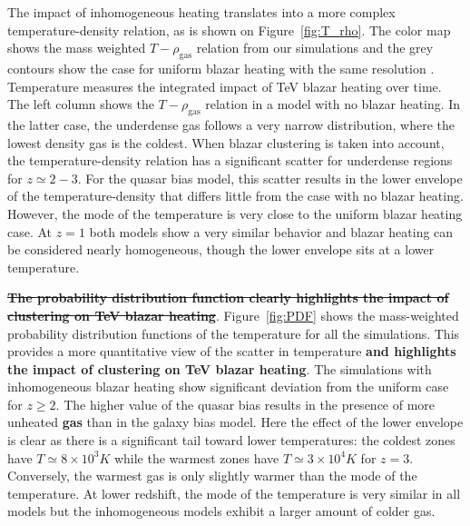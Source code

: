 \documentclass[numberedappendix]{emulateapj}
\newcommand\Ec[1]{{\color{magenta} \bf #1}} %
\begin{document}
The impact of inhomogeneous heating translates into a more complex temperature-density relation, as is shown on Figure~\ref{fig:T_rho}. The color map shows the mass weighted $T-\rho_{\mathrm{gas}}$ relation from our simulations and the grey contours show the case for uniform blazar heating with the same resolution \citep{2012MNRAS.423..149P}. Temperature measures the integrated impact of TeV blazar heating over time. The left column shows the $T-\rho_{\mathrm{gas}}$ relation in a model with no blazar heating. In the latter case, the underdense gas follows a very narrow distribution, where the lowest density gas is the coldest.  When blazar clustering is taken into account, the temperature-density relation has a significant scatter for underdense regions for $z\simeq 2-3$. For the quasar bias model, this scatter results in the lower envelope of the temperature-density that differs little from the case with no blazar heating. However, the mode of the temperature is very close to the uniform blazar heating case. At $z=1$  both models show a very similar behavior and blazar heating can be considered nearly homogeneous, though the lower envelope sits at a lower temperature.

\Ec{\sout{The probability distribution function clearly highlights the impact of clustering on TeV blazar heating}}. Figure~\ref{fig:PDF} shows the mass-weighted probability distribution functions of the temperature for all the simulations. This provides a more quantitative view of the scatter in temperature \Ec{and highlights the impact of clustering on TeV blazar heating}. The simulations with  inhomogeneous blazar heating show significant deviation from the uniform case  for $z\geqslant 2$. The higher value of the quasar bias results in the presence of more unheated \Ec{gas} than in the galaxy bias model. Here the effect of the lower envelope is clear as there is a significant tail toward lower temperatures: the coldest zones have $T\simeq 8 \times 10^3K$ while the warmest zones have $T\simeq 3\times 10^4K$ for $z=3$. Conversely, the warmest gas is only slightly warmer than the mode of the temperature. At lower redshift, the mode of the temperature is very similar in all models but the inhomogeneous models exhibit a larger amount of colder gas.
\end{document}
